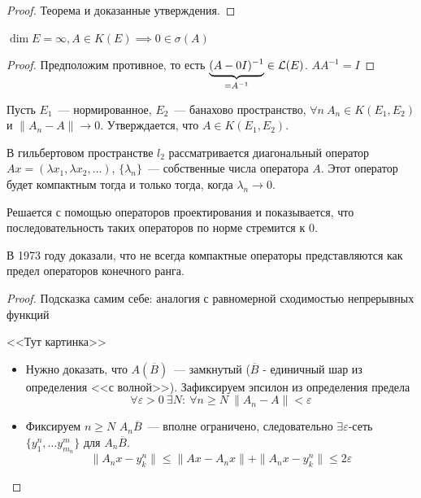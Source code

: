 \begin{proof}
    Теорема  и доказанные утверждения.
\end{proof}

\begin{corollary}
    $\dim E = \infty, A \in K(E) \implies 0 \in \sigma(A)$
\end{corollary}

\begin{proof}
    Предположим противное, то есть $\underbrace{(A - 0 I)^{-1}}_{=A^{-1}} \in \mathcal{L}(E)$. $AA^{-1} = I$ %
\end{proof}

\begin{theorem}[12.1]
    Пусть $E_1$~--- нормированное, $E_2$~--- банахово пространство, $\forall n \: A_n \in K(E_1, E_2)$ и $\|A_n - A\| \to 0$. Утверждается, что $A \in K(E_1, E_2)$.
\end{theorem}

\begin{example}
    В гильбертовом пространстве $l_2$ рассматривается диагональный оператор
    $Ax = (\lambda x_1, \lambda x_2, \ldots)$, $\{\lambda_n\}$~--- собственные числа оператора $A$. Этот оператор будет компактным тогда и только тогда, когда $\lambda_n \to 0$.
    
    Решается с помощью операторов проектирования и показывается, что последовательность таких операторов по норме стремится к 0.
\end{example}

В 1973 году доказали, что не всегда компактные операторы представляются как предел операторов конечного ранга.


\begin{proof}
    Подсказка самим себе: аналогия с равномерной сходимостью непрерывных функций

    <<Тут картинка>> %

\begin{itemize}
    \item[1.] Нужно доказать, что $A(\overline{B})$~--- замкнутый ($\overline{B}$ - единичный шар из определения <<с волной>>). Зафиксируем эпсилон из определения предела
    \[ \forall \varepsilon > 0 \: \exists N: \: \forall n \geqslant N \: \|A_n-A\| < \varepsilon\]
    \item[2.] Фиксируем $n \geqslant N$
    $A_n \overline{B}$~--- вполне ограничено, следовательно
    $\exists \varepsilon$-сеть $\{y_1^n, \ldots y_{m_n}^m\}$ для $A_n \overline{B}$.
    \[
    \|A_n x - y_k^n\| \leqslant \|A x - A_n x\| + \|A_n x - y_k^n\| \leqslant 2 \varepsilon
    \]
\end{itemize}
\end{proof}

